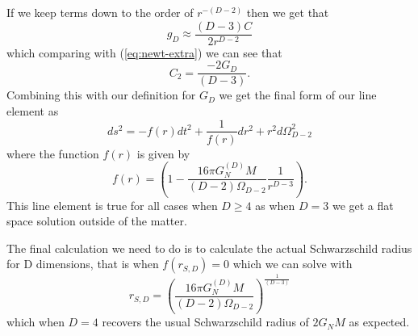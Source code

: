 \documentclass[12pt]{article}
\numberwithin{equation}{section}
\numberwithin{figure}{section}
\begin{document}
If we keep terms down to the order of $r^{-(D-2)}$ then we get that 
\begin{equation}
	g_{D}\approx \frac{(D-3)C}{2r^{D-2}}
\end{equation}
which comparing with (\ref{eq:newt-extra}) we can see that
\begin{equation}
	C_{2}=\frac{-2G_{D}}{(D-3)}.
\end{equation}
Combining this with our definition for $G_{D}$ we get the final form of our line element as 
\begin{equation}
	ds^2 =-f(r)dt^2 + \frac{1}{f(r)}dr^2 + r^2 d{\Omega}^2_{D-2}
\end{equation}
where the function $f(r)$ is given by
\begin{equation}
	f(r)=\left(1-\frac{16\pi G_{N}^{(D)}M}{(D-2)\Omega_{D-2}}\frac{1}{r^{D-3}}\right).
\end{equation}
This line element is true for all cases when $D\ge 4$ as when $D=3$ we get a flat space solution outside of the matter.

The final calculation we need to do is to calculate the actual Schwarzschild radius for D dimensions, that is when $f(r_{S,D})=0$ which we can solve with
\begin{equation}
	r_{S,D}=\left(\frac{16\pi G_{N}^{(D)}M}{(D-2)\Omega_{D-2}}\right)^\frac{1}{(D-3)}
\end{equation} 
which when $D=4$ recovers the usual Schwarzschild radius of $2G_{N}M$ as expected.
\end{document}
